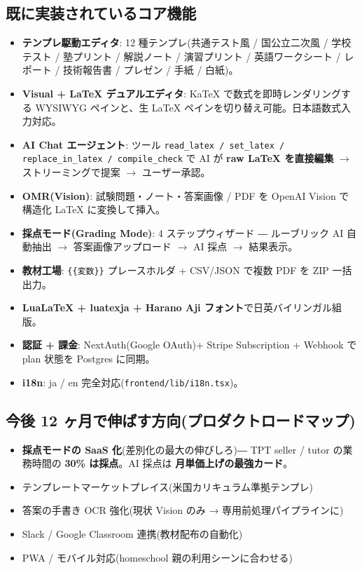 \documentclass{article}
\newcommand{\hl}[1]{\textcolor{cAlert}{\textbf{#1}}}
\begin{document}
\subsection*{既に実装されているコア機能}
\begin{itemize}[leftmargin=1.4em,itemsep=2pt]
  \item \textbf{テンプレ駆動エディタ}: 12 種テンプレ(共通テスト風 / 国公立二次風 /
        学校テスト / 塾プリント / 解説ノート / 演習プリント / 英語ワークシート /
        レポート / 技術報告書 / プレゼン / 手紙 / 白紙)。
  \item \textbf{Visual + LaTeX デュアルエディタ}: KaTeX で数式を即時レンダリングする
        WYSIWYG ペインと、生 LaTeX ペインを切り替え可能。日本語数式入力対応。
  \item \textbf{AI Chat エージェント}: ツール
        \texttt{read\_latex / set\_latex / replace\_in\_latex / compile\_check} で
        AI が \textbf{raw LaTeX を直接編集} $\to$ ストリーミングで提案 $\to$ ユーザー承認。
  \item \textbf{OMR(Vision)}: 試験問題・ノート・答案画像 / PDF を OpenAI Vision で
        構造化 LaTeX に変換して挿入。
  \item \hl{採点モード(Grading Mode)}: 4 ステップウィザード
        ― ルーブリック AI 自動抽出 $\to$ 答案画像アップロード $\to$ AI 採点 $\to$ 結果表示。
  \item \textbf{教材工場}: \verb|{{変数}}| プレースホルダ + CSV/JSON で複数 PDF を
        ZIP 一括出力。
  \item \textbf{LuaLaTeX + luatexja + Harano Aji フォント}で日英バイリンガル組版。
  \item \textbf{認証 + 課金}: NextAuth(Google OAuth)+ Stripe Subscription
        + Webhook で plan 状態を Postgres に同期。
  \item \textbf{i18n}: ja / en 完全対応(\texttt{frontend/lib/i18n.tsx})。
\end{itemize}

\subsection*{今後 12 ヶ月で伸ばす方向(プロダクトロードマップ)}
\begin{itemize}[leftmargin=1.4em,itemsep=2pt]
  \item \hl{採点モードの SaaS 化}(差別化の最大の伸びしろ)―
        TPT seller / tutor の業務時間の \textbf{30\% は採点}。AI 採点は
        \textbf{月単価上げの最強カード}。
  \item テンプレートマーケットプレイス(米国カリキュラム準拠テンプレ)
  \item 答案の手書き OCR 強化(現状 Vision のみ → 専用前処理パイプラインに)
  \item Slack / Google Classroom 連携(教材配布の自動化)
  \item PWA / モバイル対応(homeschool 親の利用シーンに合わせる)
\end{itemize}
\end{document}
